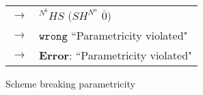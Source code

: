 \begin{figure}
\begin{tabular}{ll}
\vspace{5pt}

$\rightarrow$ & ${^{N^{b}}H}S$ $(SH^{N^{a}}$ $\overline{0})$ \\

\vspace{5pt}

$\rightarrow$ & $\mathtt{wrong}$ ``Parametricity violated" \\

\vspace{5pt}

$\rightarrow$ & \textbf{Error}: ``Parametricity violated"
\end{tabular}
\caption{Scheme breaking parametricity}
\label{forall-2}
\end{figure}